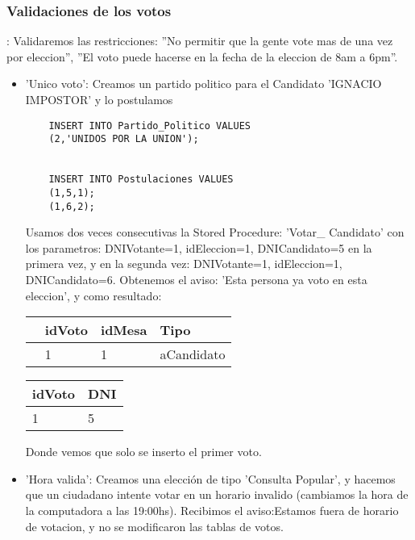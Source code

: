 \subsubsection{Validaciones de los votos}: Validaremos las restricciones: ''No permitir que la gente vote mas de una vez por eleccion'', ''El voto puede hacerse en la fecha de la eleccion de 8am a 6pm''. 
	\begin{itemize}
	\item 'Unico voto': Creamos un partido politico para el Candidato 'IGNACIO IMPOSTOR' y lo postulamos

	\begin{lstlisting}
	INSERT INTO Partido_Politico VALUES
	(2,'UNIDOS POR LA UNION');
	
	
	INSERT INTO Postulaciones VALUES
	(1,5,1);
	(1,6,2);
	\end{lstlisting}

 Usamos dos veces consecutivas la Stored Procedure: 'Votar\_ Candidato' con los parametros: DNIVotante=1, idEleccion=1, DNICandidato=5 en la primera vez, y en la segunda vez: DNIVotante=1, idEleccion=1, DNICandidato=6. Obtenemos el aviso: 'Esta persona ya voto en esta eleccion', y como resultado:
 
 	\vspace{2mm}	
 	
 \begin{tabular}{| l| l| l| l| }
	\hline 
	   & idVoto & idMesa & Tipo \\
	  \hline 
	   &1 &1 & aCandidato \\
	   \hline 
	\end{tabular}
	\vspace{2mm}	
	
		\vspace{2mm}
			
	\begin{tabular}{| l| l|}
	\hline 
	idVoto & DNI \\
	\hline 
	  1 & 5 \\
	\hline 
	\end{tabular}
	
		\vspace{2mm}	
		Donde vemos que solo se inserto el primer voto.
		
	\item 'Hora valida': Creamos una elección de tipo 'Consulta Popular', y hacemos que un ciudadano intente votar en un horario invalido (cambiamos la hora de la computadora a las 19:00hs). Recibimos el aviso:Estamos fuera de horario de votacion, y no se modificaron las tablas de votos.

	
	\end{itemize}					


